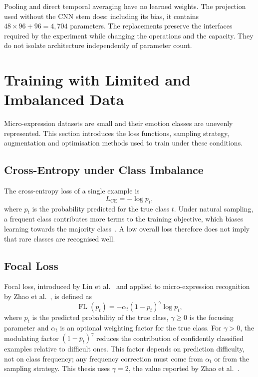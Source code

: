 Pooling and direct temporal averaging have no learned weights. The projection used without the CNN stem does: including its bias, it contains $48\times96+96=4{,}704$ parameters. The replacements preserve the interfaces required by the experiment while changing the operations and the capacity. They do not isolate architecture independently of parameter count.


\section{Training with Limited and Imbalanced Data}
\label{sec:scarcity-skew}

Micro-expression datasets are small and their emotion classes are unevenly represented. This section introduces the loss functions, sampling strategy, augmentation and optimisation methods used to train under these conditions.

\subsection{Cross-Entropy under Class Imbalance}
\label{sec:skew-cross-entropy}

The cross-entropy loss of a single example is
\begin{equation}
	L_{\mathrm{CE}}=-\log p_t,
	\label{eq:cross-entropy}
\end{equation}
where $p_t$ is the probability predicted for the true class $t$. Under natural sampling, a frequent class contributes more terms to the training objective, which biases learning towards the majority class~\cite{he2009}. A low overall loss therefore does not imply that rare classes are recognised well.

\subsection{Focal Loss}
\label{sec:focal-loss}

Focal loss, introduced by Lin et al.~\cite{lin2017} and applied to micro-expression recognition by Zhao et al.~\cite{zhaoS2021}, is defined as
\begin{equation}
	\operatorname{FL}(p_t)=-\alpha_t(1-p_t)^\gamma\log p_t,
	\label{eq:focal-loss}
\end{equation}
where $p_t$ is the predicted probability of the true class, $\gamma\geq0$ is the focusing parameter and $\alpha_t$ is an optional weighting factor for the true class. For $\gamma>0$, the modulating factor $(1-p_t)^\gamma$ reduces the contribution of confidently classified examples relative to difficult ones. This factor depends on prediction difficulty, not on class frequency; any frequency correction must come from $\alpha_t$ or from the sampling strategy. This thesis uses $\gamma=2$, the value reported by Zhao et al.~\cite{zhaoS2021}.

